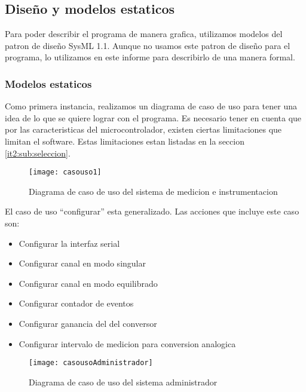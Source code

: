 \subsection{Diseño y modelos estaticos} %
\label{it2:sub:diseno_y_modelos_estaticos}

Para poder describir el programa de manera grafica, utilizamos modelos del patron de diseño SysML 1.1. Aunque no usamos este patron de diseño para el programa, lo utilizamos en este informe para describirlo de una manera formal.

\subsubsection{Modelos estaticos} %
\label{it2:subsub:modelos_estaticos}

Como primera instancia, realizamos un diagrama de caso de uso para tener una idea de lo que se quiere lograr con el programa. Es necesario tener en cuenta que por las caracteristicas del microcontrolador, existen ciertas limitaciones que limitan el software. Estas limitaciones estan listadas en la seccion \ref{it2:sub:seleccion}.

\begin{figure}[h]
  \centering
  \texttt{[image: casouso1]}
  \caption{Diagrama de caso de uso del sistema de medicion e instrumentacion}\label{fig:casouso1}
\end{figure}

El caso de uso ``configurar'' esta generalizado. Las acciones que incluye este caso son:
\begin{itemize}
  \item Configurar la interfaz serial
  \item Configurar canal en modo singular
  \item Configurar canal en modo equilibrado
  \item Configurar contador de eventos
  \item Configurar ganancia del del conversor
  \item Configurar intervalo de medicion para conversion analogica
\end{itemize}

\begin{figure}[h]
  \centering
  \texttt{[image: casousoAdministrador]}
  \caption{Diagrama de caso de uso del sistema administrador}\label{fig:casousoAdministrador}
\end{figure}

